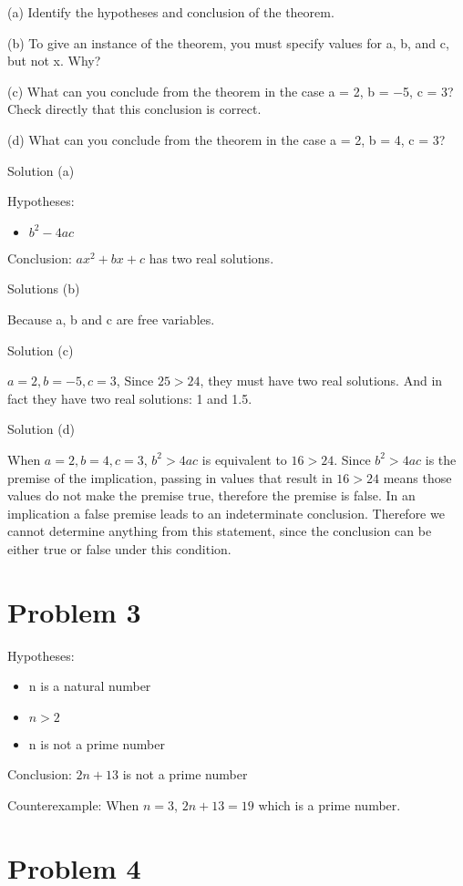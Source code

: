 \documentclass{article}
\begin{document}
(a) Identify the hypotheses and conclusion of the theorem.

(b) To give an instance of the theorem, you must specify values for a, b,
and c, but not x. Why?

(c) What can you conclude from the theorem in the case a = 2, b = −5,
c = 3? Check directly that this conclusion is correct.

(d) What can you conclude from the theorem in the case a = 2, b = 4, c
= 3?

Solution (a)

Hypotheses:
\begin{itemize}
\item $b^2 - 4ac$
\end{itemize}

Conclusion: $ax^2 + bx + c$ has two real solutions.

Solutions (b)

Because a, b and c are free variables.

Solution (c)

$a = 2, b = -5, c=3$, Since $25 > 24$, they must have two real
solutions. And in fact they have two real solutions: 1 and 1.5.

Solution (d)

When $a =2, b=4, c=3$, $b^2 > 4ac$ is equivalent to $16 > 24$.
Since $b^2 > 4ac$ is the premise of the implication, passing in values
that result in $16 > 24$ means those values do not make the premise
true, therefore the premise is false. In an implication a false premise
leads to an indeterminate conclusion. Therefore we cannot determine
anything from this statement, since the conclusion can be either
true or false under this condition.


\section{Problem 3}

Hypotheses:
\begin{itemize}
\item n is a natural number
\item $n > 2$
\item n is not a prime number
\end{itemize}

Conclusion: $2n + 13$ is not a prime number

Counterexample: When $n = 3$, $2n + 13 = 19$ which is a prime number.

\section{Problem 4}
\end{document}

